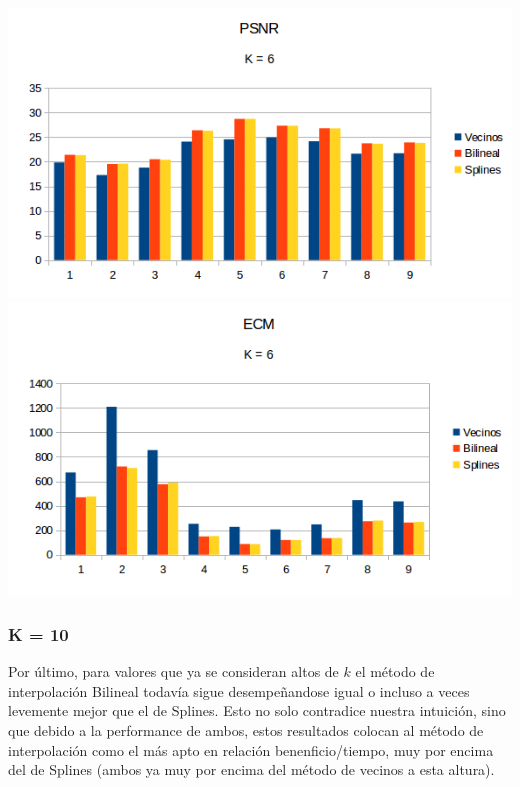 \begin{center}
\includegraphics[scale=0.50]{imagenes/K6PSNR.png}
\includegraphics[scale=0.50]{imagenes/K6ECM.png}
\end{center}

\subsubsection{K = 10}
Por último, para valores que ya se consideran altos de $k$ el método de interpolación Bilineal todavía sigue desempeñandose igual o incluso a veces levemente mejor que el de Splines. Esto no solo contradice nuestra intuición, sino que debido a la performance de ambos, estos resultados colocan al método de interpolación como el más apto en relación benenficio/tiempo, muy por encima del de Splines (ambos ya muy por encima del método de vecinos a esta altura).

